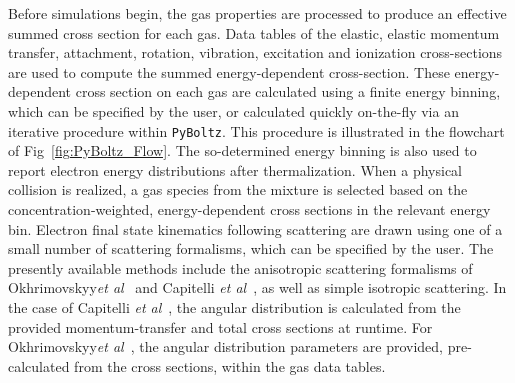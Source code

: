 \documentclass[3p,11pt]{elsarticle}
\begin{document}
Before simulations begin, the gas properties are processed to produce an effective summed cross section for each gas. Data tables of the elastic, elastic momentum transfer, attachment, rotation, vibration, excitation and ionization cross-sections are used to compute the summed energy-dependent cross-section.  These energy-dependent cross section on each gas are calculated using a finite energy binning, which can be specified by the user, or calculated quickly on-the-fly via an iterative procedure within {\tt PyBoltz}. This procedure is illustrated in the flowchart of Fig~\ref{fig:PyBoltz_Flow}.  The so-determined energy binning is also used to report electron energy distributions after thermalization.  When a physical collision is realized, a gas species from the mixture is selected based on the concentration-weighted, energy-dependent cross sections in the relevant energy bin.  Electron final state kinematics following scattering are drawn using one of a small number of scattering formalisms, which can be specified by the user.  The presently available methods include the anisotropic scattering formalisms of Okhrimovskyy{\em et al}~\cite{okhrimovskyy2002electron} and Capitelli {\em et al}~\cite{capitelli2000collision}, as well as simple isotropic scattering.  In the case of Capitelli {\em et al}~\cite{capitelli2000collision}, the angular distribution is calculated from the provided momentum-transfer and total cross sections at runtime.  For Okhrimovskyy{\em et al}~\cite{okhrimovskyy2002electron}, the angular distribution parameters are provided, pre-calculated from the cross sections, within the gas data tables.
\end{document}
